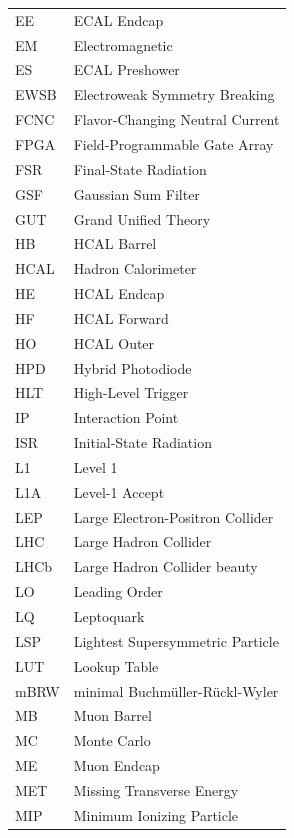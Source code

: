 \documentclass[12pt]{thesis}  %
\begin{document}
\begin{longtable}[l]{@{}l@{\ \ \ \ \ \ \ \ \ \ \ \ }l}
EE         & ECAL Endcap \\
EM         & Electromagnetic \\
ES         & ECAL Preshower \\
EWSB       & Electroweak Symmetry Breaking \\
FCNC       & Flavor-Changing Neutral Current \\
FPGA       & Field-Programmable Gate Array \\
FSR        & Final-State Radiation \\
GSF        & Gaussian Sum Filter \\
GUT        & Grand Unified Theory \\
HB         & HCAL Barrel \\
HCAL       & Hadron Calorimeter \\
HE         & HCAL Endcap \\
HF         & HCAL Forward \\
HO         & HCAL Outer \\
HPD        & Hybrid Photodiode \\
HLT        & High-Level Trigger \\
IP         & Interaction Point \\
ISR        & Initial-State Radiation \\
L1         & Level 1 \\
L1A        & Level-1 Accept \\
LEP        & Large Electron-Positron Collider \\
LHC        & Large Hadron Collider \\
LHCb       & Large Hadron Collider beauty \\
LO         & Leading Order \\
LQ         & Leptoquark \\
LSP        & Lightest Supersymmetric Particle \\
LUT        & Lookup Table \\
mBRW       & minimal Buchm\"{u}ller-R\"{u}ckl-Wyler \\
MB         & Muon Barrel \\
MC         & Monte Carlo \\
ME         & Muon Endcap \\
MET        & Missing Transverse Energy \\
MIP        & Minimum Ionizing Particle \\

\end{longtable}
\end{document}
